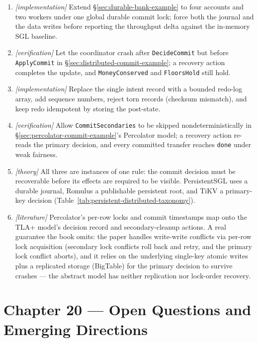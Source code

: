 \begin{enumerate}
    \item \emph{[implementation]} Extend \S\ref{sec:durable-bank-example} to
          four accounts and two workers under one global durable commit
          lock; force both the journal and the data writes before reporting
          the throughput delta against the in-memory SGL baseline.
    \item \emph{[verification]} Let the coordinator crash after
          \texttt{DecideCommit} but before \texttt{ApplyCommit} in
          \S\ref{sec:distributed-commit-example}; a recovery action completes
          the update, and \texttt{MoneyConserved} and \texttt{FloorsHold}
          still hold.
    \item \emph{[implementation]} Replace the single intent record with a
          bounded redo-log array, add sequence numbers, reject torn records
          (checksum mismatch), and keep redo idempotent by storing the
          post-state.
    \item \emph{[verification]} Allow \texttt{CommitSecondaries} to be
          skipped nondeterministically in
          \S\ref{sec:percolator-commit-example}'s
          Percolator model; a recovery action re-reads the primary decision,
          and every committed transfer reaches \texttt{done} under weak
          fairness.
    \item \emph{[theory]} All three are instances of one rule: the commit
          decision must be recoverable before its effects are required to be
          visible.  PersistentSGL uses a durable journal, Romulus a
          publishable persistent root, and TiKV a primary-key decision
          (Table~\ref{tab:persistent-distributed-taxonomy}).
    \item \emph{[literature]} Percolator's per-row locks and commit
          timestamps map onto the TLA+ model's decision record and
          secondary-cleanup actions.  A real guarantee the book omits: the
          paper handles write-write conflicts via per-row lock acquisition
          (secondary lock conflicts roll back and retry, and the primary
          lock conflict aborts), and it relies on the underlying
          single-key atomic writes plus a replicated storage (BigTable) for
          the primary decision to survive crashes --- the abstract model has
          neither replication nor lock-order recovery.
\end{enumerate}

\section*{Chapter 20 --- Open Questions and Emerging Directions}

